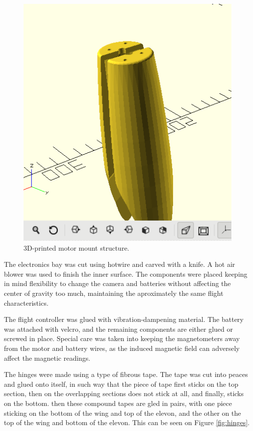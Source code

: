 \begin{figure}[H]
\centering
  \includegraphics[width=\linewidth]{figs/motormount.png}
  \caption{3D-printed motor mount structure.}
  \label{fig:motormount}
\end{figure}
	

The electronics bay was cut using hotwire and carved with a knife. A hot air blower was used to finish the inner surface. The components were placed keeping in mind flexibility to change the camera and batteries without affecting the center of gravity too much, maintaining the aproximately the same flight characteristics.

The flight controller was glued with vibration-dampening material. The battery was attached with velcro, and the remaining components are either glued or screwed in place. Special care was taken into keeping the magnetometers away from the motor and battery wires, as the induced magnetic field can adversely affect the magnetic readings.

The hinges were made using a type of fibrous tape. The tape was cut into peaces and glued onto itself, in such way that the piece of tape first sticks on the top section, then on the overlapping sections does not stick at all, and finally, sticks on the bottom.
then these compound tapes are gled in pairs, with one piece sticking on the bottom of the wing and top of the elevon, and the other on the top of the wing and bottom of the elevon. This can be seen on Figure \ref{fig:hinges}.


